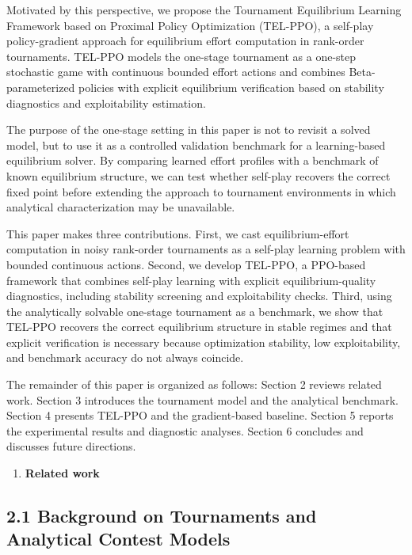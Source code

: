 \documentclass[
]{article}
\begin{document}
Motivated by this perspective, we propose the Tournament Equilibrium
Learning Framework based on Proximal Policy Optimization (TEL-PPO), a
self-play policy-gradient approach for equilibrium effort computation in
rank-order tournaments. TEL-PPO models the one-stage tournament as a
one-step stochastic game with continuous bounded effort actions and
combines Beta-parameterized policies with explicit equilibrium
verification based on stability diagnostics and exploitability
estimation.

The purpose of the one-stage setting in this paper is not to revisit a
solved model, but to use it as a controlled validation benchmark for a
learning-based equilibrium solver. By comparing learned effort profiles
with a benchmark of known equilibrium structure, we can test whether
self-play recovers the correct fixed point before extending the approach
to tournament environments in which analytical characterization may be
unavailable.

This paper makes three contributions. First, we cast equilibrium-effort
computation in noisy rank-order tournaments as a self-play learning
problem with bounded continuous actions. Second, we develop TEL-PPO, a
PPO-based framework that combines self-play learning with explicit
equilibrium-quality diagnostics, including stability screening and
exploitability checks. Third, using the analytically solvable one-stage
tournament as a benchmark, we show that TEL-PPO recovers the correct
equilibrium structure in stable regimes and that explicit verification
is necessary because optimization stability, low exploitability, and
benchmark accuracy do not always coincide.

The remainder of this paper is organized as follows: Section 2 reviews
related work. Section 3 introduces the tournament model and the
analytical benchmark. Section 4 presents TEL-PPO and the gradient-based
baseline. Section 5 reports the experimental results and diagnostic
analyses. Section 6 concludes and discusses future directions.

\begin{enumerate}
\def\labelenumi{\arabic{enumi}.}
\setcounter{enumi}{1}
\item
  \textbf{Related work}
\end{enumerate}

\subsection{\texorpdfstring{\textbf{2.1 Background on Tournaments and
Analytical Contest
Models}}{2.1 Background on Tournaments and Analytical Contest Models}}\label{background-on-tournaments-and-analytical-contest-models}
\end{document}
